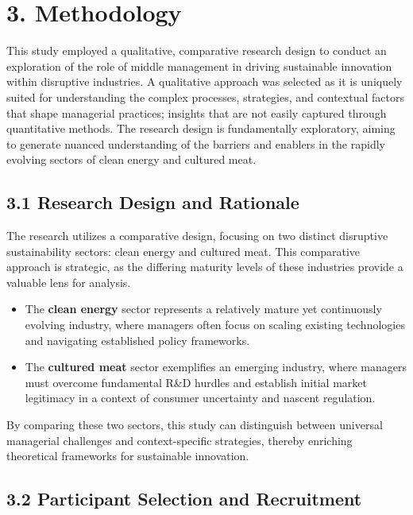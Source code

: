\section*{3. Methodology}

This study employed a qualitative, comparative research design to conduct an exploration of the role of middle management in driving sustainable innovation within disruptive industries. A qualitative approach was selected as it is uniquely suited for understanding the complex processes, strategies, and contextual factors that shape managerial practices; insights that are not easily captured through quantitative methods. The research design is fundamentally exploratory, aiming to generate nuanced understanding of the barriers and enablers in the rapidly evolving sectors of clean energy and cultured meat.

\subsection*{3.1 Research Design and Rationale}

The research utilizes a comparative design, focusing on two distinct disruptive sustainability sectors: clean energy and cultured meat. This comparative approach is strategic, as the differing maturity levels of these industries provide a valuable lens for analysis. 
\begin{itemize}
	\item The \textbf{clean energy} sector represents a relatively mature yet continuously evolving industry, where managers often focus on scaling existing technologies and navigating established policy frameworks.
	\item The \textbf{cultured meat} sector exemplifies an emerging industry, where managers must overcome fundamental R\&D hurdles and establish initial market legitimacy in a context of consumer uncertainty and nascent regulation.
\end{itemize}
By comparing these two sectors, this study can distinguish between universal managerial challenges and context-specific strategies, thereby enriching theoretical frameworks for sustainable innovation.

\subsection*{3.2 Participant Selection and Recruitment}

